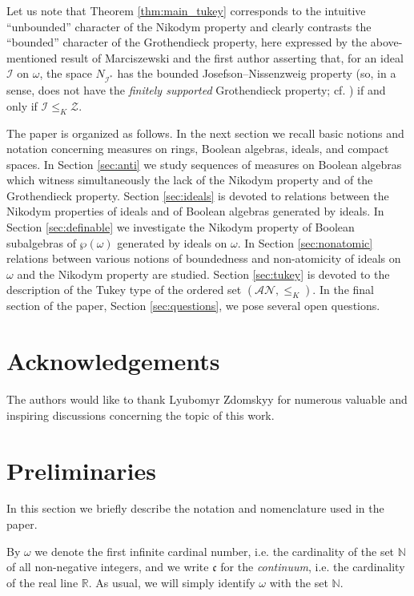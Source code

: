 \documentclass[a4paper,11pt,fleqn]{amsart}
\theoremstyle{definition}
\theoremstyle{remark}
\numberwithin{equation}{section}
\newcommand{\frakc}{\mathfrak{c}}
\newcommand{\N}{\mathbb{N}}
\newcommand{\R}{\mathbb{R}}
\newcommand{\aA}{\mathcal{A}}
\newcommand{\iI}{\mathcal{I}}
\newcommand{\nN}{\mathcal{N}}
\newcommand{\zZ}{\mathcal{Z}}
\newcommand{\wo}{{\wp(\omega)}}%
\begin{document}
Let us note that Theorem \ref{thm:main_tukey} corresponds to the intuitive ``unbounded'' character of the Nikodym property and clearly contrasts the ``bounded'' character of the Grothendieck property, here expressed by the above-mentioned result of Marciszewski and the first author \cite{MS24} asserting that, for an ideal $\iI$ on $\omega$, the space $N_{\iI^*}$ has the bounded Josefson--Nissenzweig property (so, in a sense, does not have the \textit{finitely supported} Grothendieck property; cf. \cite{KSZ23}) if and only if $\iI\le_K\zZ$.

\medskip

The paper is organized as follows. In the next section we recall basic notions and notation concerning measures on rings, Boolean algebras, ideals, and compact spaces. In Section \ref{sec:anti} we study sequences of measures on Boolean algebras which witness simultaneously the lack of the Nikodym property and of the Grothendieck property. Section \ref{sec:ideals} is devoted to relations between the Nikodym properties of ideals and of Boolean algebras generated by ideals. In Section \ref{sec:definable} we investigate the Nikodym property of Boolean subalgebras of $\wo$ generated by ideals on $\omega$. In Section \ref{sec:nonatomic} relations between various notions of boundedness and non-atomicity of ideals on $\omega$ and the Nikodym property are studied. Section \ref{sec:tukey} is devoted to the description of the Tukey type of the ordered set $(\aA\nN,\le_K)$. In the final section of the paper, Section \ref{sec:questions}, we pose several open questions.


\section*{Acknowledgements}

The authors would like to thank Lyubomyr Zdomskyy for numerous valuable and inspiring discussions concerning the topic of this work.


\section{Preliminaries\label{sec:prelim}}

In this section we briefly describe the notation and nomenclature used in the paper.

\medskip

By $\omega$ we denote the first infinite cardinal number, i.e. the cardinality of the set $\N$ of all non-negative integers, and we write $\frakc$ for the \textit{continuum}, i.e. the cardinality of the real line $\R$. As usual, we will simply identify $\omega$ with the set $\N$. 
\end{document}
